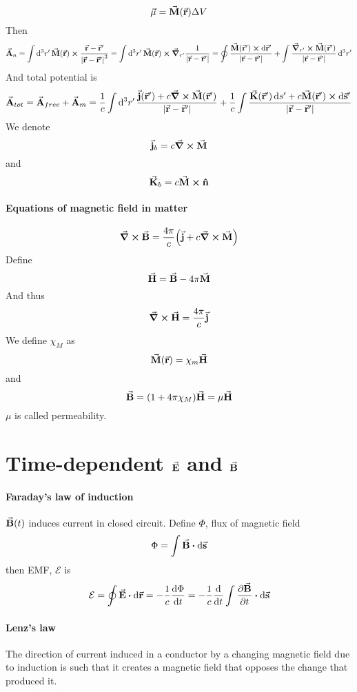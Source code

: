 $$\va{\mu} = \va{M}(\va{r}) \Delta V$$
Then
$$\va{A}_n = \int \dd[3]{r'}\va{M}(\va{r}) \cross \frac{\va{r}-\va{r}'}{\abs{\va{r}-\va{r}'}^3} = \int \dd[3]{r'}\va{M}(\va{r}) \cross \grad_{r'} \frac{1}{\abs{\va{r}-\va{r}'}} = \oint \frac{\va{M}(\va{r}') \cross \dd{\va{r}'}}{\abs{\va{r}-\va{r}'}} + \int \frac{\grad_{r'}\cross \va{M}(\va{r}')}{\abs{\va{r}-\va{r}'}} \dd[3]{r'}$$
And total potential is
$$\va{A}_{tot} = \va{A}_{free} + \va{A}_{m} = \frac{1}{c} \int \dd[3]{r'} \frac{\va{j}(\va{r}') + c \curl{\va{M}(\va{r}')}}{\abs{\va{r}-\va{r}'}} + \frac{1}{c} \int \frac{\va{K}(\va{r}')\dd{s'} + c\va{M}(\va{r}') \cross \dd{\va{s}'}}{\abs{\va{r}-\va{r}'}}$$
We denote
$$\va{j}_b = c \curl{\va{M}}$$
and
$$\va{K}_b = c\va{M} \cross \vu{n}$$
\paragraph{Equations of magnetic field in matter}
$$\curl{\va{B}} = \frac{4\pi}{c} \qty(\va{j} + c\curl{\va{M}})$$
Define
$$\va{H} = \va{B} - 4\pi \va{M}$$
And thus
$$\curl{\va{H}} = \frac{4\pi}{c} \va{j}$$
We define $\chi_M$ as
$$\va{M}(\va{r}) = \chi_m \va{H}$$
and
$$\va{B}= (1+4\pi \chi_M) \va{H} = \mu \va{H}$$
$\mu$ is called permeability.

\section{Time-dependent $\va{E}$ and $\va{B}$ }
\paragraph{Faraday's law of induction}
$\va{B}(t)$ induces current in closed circuit.
Define $\Phi$, flux of magnetic field
$$\Phi = \int \va{B} \vdot \dd{\va{s}}$$
then EMF, $\mathcal{E}$ is
$$\mathcal{E} = \oint \va{E} \vdot \dd{\va{r}} = -\frac{1}{c} \dv{\Phi}{t} =-\frac{1}{c} \dv{t} \int \pdv{\va{B}}{t} \vdot \dd{\va{s}}$$
\paragraph{Lenz's law}
The direction of current induced in a conductor by a changing magnetic field due to induction is such that it creates a magnetic field that opposes the change that produced it.
